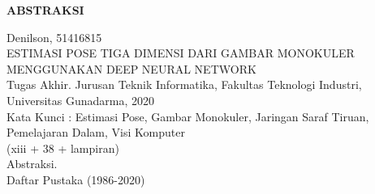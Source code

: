 \newpage %
\begin{center}
    \begin{large}\textbf{ABSTRAKSI}\end{large}
\end{center}

\vspace{5mm}

\noindent Denilson, 51416815 \\
ESTIMASI POSE TIGA DIMENSI DARI GAMBAR MONOKULER MENGGUNAKAN DEEP NEURAL NETWORK\\
Tugas Akhir. Jurusan Teknik Informatika, Fakultas Teknologi Industri, \\
Universitas Gunadarma, 2020\\
Kata Kunci : Estimasi Pose, Gambar Monokuler, Jaringan Saraf Tiruan, Pemelajaran Dalam, Visi Komputer\\
\noindent (xiii + 38 + lampiran)\\

Abstraksi.\\

\noindent Daftar Pustaka (1986-2020)
